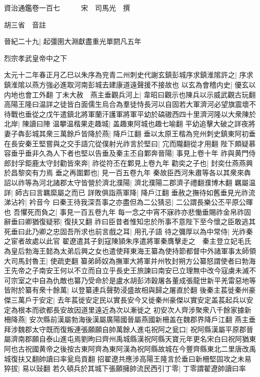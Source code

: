 資治通鑑卷一百七　　　宋　司馬光　撰

胡三省　音註

晉紀二十九|{
	起彊圉大淵獻盡重光單閼凡五年}


烈宗孝武皇帝中之下

太元十二年春正月乙巳以朱序為兖青二州刺史代謝玄鎮彭城序求鎮淮隂許之|{
	序求鎮淮隂以燕方強必進取河南彭城去建康道遠聲援不接故也}
以玄為會稽内史|{
	優玄以内地也會工外翻}
丁未大赦　燕主垂觀兵河上|{
	韋昭曰觀示也陳兵以示威武觀古玩翻}
高陽王隆曰温詳之徒皆白面儒生烏合為羣徒恃長河以自固若大軍濟河必望旗震壞不待戰也垂從之戊午遣鎮北將軍蘭汗護軍將軍平幼於碻磝西四十里濟河隆以大衆陳於北岸|{
	陳讀曰陣}
温攀温楷果走趣城|{
	盖趣東阿城也趣七喻翻}
平幼追擊大破之詳夜將妻子犇彭城其衆三萬餘戶皆降於燕|{
	降戶江翻}
垂以太原王楷為兖州刺史鎮東阿初垂在長安秦王堅嘗與之交手語宂從僕射光祚言於堅曰|{
	宂而隴翻從才用翻}
陛下頗疑慕容垂乎垂非久為人下者也堅以告垂及秦主丕自鄴奔晉陽|{
	事見上卷十年}
祚與黄門侍郎封孚鉅鹿太守封勸皆來奔|{
	祚從符丕在鄴見上卷九年}
勸奕之子也|{
	封奕仕燕燕興於昌黎奕有力焉}
垂之再圍鄴也|{
	見一百五卷九年}
秦故臣西河朱肅等各以其衆來犇詔以祚等為河北諸郡太守皆營於濟北濮陽|{
	濟北濮陽二郡濟子禮翻濮博木翻}
羈屬温詳|{
	師古曰言羈縻屬之而已}
詳敗俱詣燕軍降|{
	降戶江翻}
垂赦之撫待如舊垂見光祚流涕沾衿|{
	衿音今}
曰秦王待我深吾事之亦盡但為二公猜忌|{
	二公謂長樂公丕平原公暉也}
吾懼死而負之|{
	事見一百五卷九年}
每一念之中宵不寐祚亦悲慟垂賜祚金帛祚固辭垂曰卿猶復疑邪|{
	復扶又翻}
祚曰臣昔者惟知忠於所事不意陛下至今懷之臣敢逃其死垂曰此乃卿之忠固吾所求也前言戲之耳|{
	用孔子語}
待之彌厚以為中常侍|{
	光祚秦之宦者故處以此官}
翟遼遣其子釗寇陳頴朱序遣將軍秦膺擊走之　秦主登立妃毛氏為皇后勃海王懿為太弟后興之女也遣使拜東海王纂為使持節都督中外諸軍事太師領大司馬封魯王|{
	使疏吏翻}
纂弟師奴為撫軍大將軍并州牧封朔方公纂怒謂使者曰勃海王先帝之子南安王何以不立而自立乎長史王旅諫曰南安已立理無中改今寇虜未滅不可宗室之中自為仇敵也纂乃受命於是盧水胡彭沛穀屠各董成張龍世新平羌雷惡地等皆附於纂有衆十餘萬|{
	以登纂連兵聲勢浸盛故相與歸之屠直於翻}
後秦主萇徙秦州豪傑三萬戶于安定|{
	去年萇徙安定民以實長安今又徙秦州豪傑以實安定盖萇起兵以安定為根本而欲都長安故因道里遠近為次以漸徙之}
初安次人齊涉聚衆八千餘家據新柵降燕|{
	安次縣前漢屬勃海後漢屬廣陽國晉屬燕國新柵盖在魏郡界降戶江翻}
燕主垂拜涉魏郡太守既而復叛連張願願自帥萬餘人進屯祝阿之瓮口|{
	祝阿縣漢屬平原郡晉屬濟南郡願自泰山進屯焉劉昫曰齊州禹城縣漢祝阿縣天寶元年更名宋白曰祝阿猶東阿也古祝國黄帝之後按古東阿齊為東阿漢為祝阿縣故城在今豐齊縣東北二里唐改禹城復扶又翻帥讀曰率瓮烏貢翻}
招翟遼共應涉高陽王隆言於垂曰新柵堅固攻之未易猝拔|{
	易以䜴翻}
若久頓兵於其城下張願擁帥流民西引丁零|{
	丁零謂翟遼帥讀曰率}

